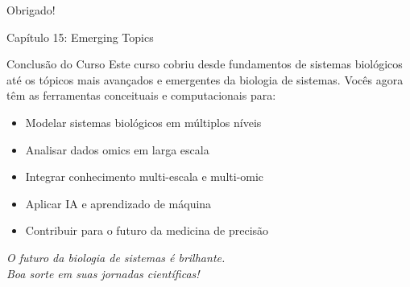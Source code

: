 \begin{frame}
\begin{center}
{\Huge Obrigado!}

\vspace{0.5cm}

{\Large Capítulo 15: Emerging Topics}

\vspace{1cm}

\begin{block}{Conclusão do Curso}
Este curso cobriu desde fundamentos de sistemas biológicos até os tópicos mais avançados e emergentes da biologia de sistemas. Vocês agora têm as ferramentas conceituais e computacionais para:
\begin{itemize}
    \item Modelar sistemas biológicos em múltiplos níveis
    \item Analisar dados omics em larga escala
    \item Integrar conhecimento multi-escala e multi-omic
    \item Aplicar IA e aprendizado de máquina
    \item Contribuir para o futuro da medicina de precisão
\end{itemize}
\end{block}

\vspace{0.5cm}

\textit{O futuro da biologia de sistemas é brilhante.\\Boa sorte em suas jornadas científicas!}
\end{center}
\end{frame}


